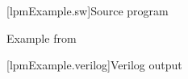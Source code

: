 
[lpmExample.sw]{Source program}

Example from \cite[Figure 9]{Dave2007}



[lpmExample.verilog]{Verilog output}


